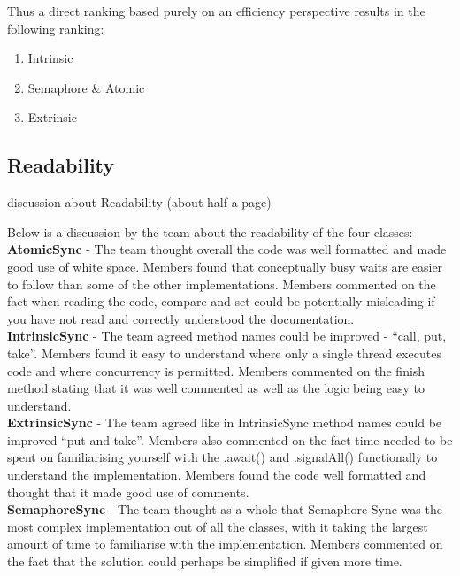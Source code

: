 \documentclass[11pt]{article}
\begin{document}
Thus a direct ranking based purely on an efficiency perspective results in the following ranking: 

\begin{enumerate}
	\item Intrinsic
	\item Semaphore \& Atomic
	\item Extrinsic
\end{enumerate}




\pagebreak
\subsection{Readability}
discussion about  Readability (about half a page)

Below is a discussion by the team about the readability of the four classes: \\

\textbf{AtomicSync} - The team thought overall the code was well formatted and made good use of white space. Members found that conceptually busy waits are easier to follow than some of the other implementations. Members commented on the fact when reading the code, compare and set could be potentially misleading if you have not read and correctly understood the documentation.\\

\textbf{IntrinsicSync} - The team agreed method names could be improved - “call, put, take”. Members found it easy to understand where only a single thread executes code and where concurrency is permitted. Members commented on the finish method stating that it was well commented as well as the logic being easy to understand. \\

\textbf{ExtrinsicSync} - The team agreed like in IntrinsicSync method names could be improved “put and take”. Members also commented on the fact time needed to be spent on familiarising yourself with the .await() and .signalAll() functionally to understand the implementation. Members found the code well formatted and thought that it made good use of comments. \\

\textbf{SemaphoreSync} - The team thought as a whole that Semaphore Sync was the most complex implementation out of all the classes, with it taking the largest amount of time to familiarise with the implementation. Members commented on the fact that the solution could perhaps be simplified if given more time.  \\
\end{document}
